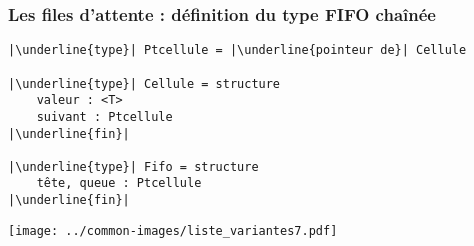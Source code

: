 \documentclass[table,handout,tikz,12pt,svgnames]{beamer}
\begin{document}
\begin{frame}[fragile=singleslide]
	\frametitle{Les files d'attente : définition du type FIFO chaînée}
	\vspace{-0.83cm}
	\begin{block}{}
		\begin{verbatim}
|\underline{type}| Ptcellule = |\underline{pointeur de}| Cellule

|\underline{type}| Cellule = structure
	valeur : <T>
	suivant : Ptcellule
|\underline{fin}|

|\underline{type}| Fifo = structure
	tête, queue : Ptcellule
|\underline{fin}|
		\end{verbatim}
	\end{block}
	\vspace{-0.5cm}	
	\begin{center}
		\hspace{-0.9cm}
		{\texttt{[image: ../common-images/liste\_variantes7.pdf]}}
	\end{center}	
\end{frame}
\end{document}
